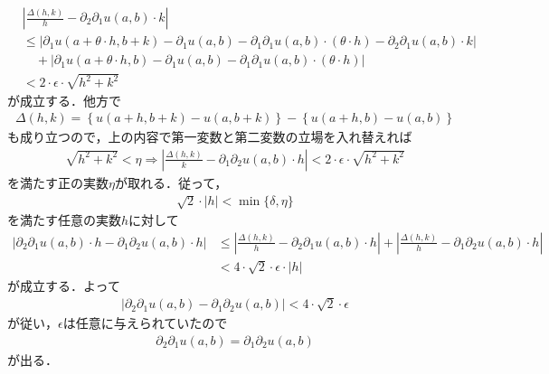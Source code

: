\begin{sketch}
		\begin{align}
			&\left|\frac{\Delta(h,k)}{h} - \partial_2 \partial_1 u(a,b) \cdot k\right| \\
			&\leq \left|\partial_1 u(a+\theta \cdot h,b+k) - \partial_1 u(a,b) 
			- \partial_1 \partial_1 u(a,b) \cdot (\theta \cdot h) - \partial_2 \partial_1 u(a,b) \cdot k\right| \\
			&\quad + \left|\partial_1 u(a+\theta \cdot h,b) - \partial_1 u(a,b) 
			- \partial_1 \partial_1 u(a,b) \cdot (\theta \cdot h)\right| \\
			&< 2 \cdot \epsilon \cdot \sqrt{h^2 + k^2}
		\end{align}
		が成立する．他方で
		\begin{align}
			\Delta(h,k) = \left\{u(a+h,b+k) - u(a,b+k)\right\} - \left\{u(a+h,b) - u(a,b)\right\}
		\end{align}
		も成り立つので，上の内容で第一変数と第二変数の立場を入れ替えれば
		\begin{align}
			\sqrt{h^2 + k^2} < \eta \Longrightarrow 
			\left|\frac{\Delta(h,k)}{k} - \partial_1 \partial_2 u(a,b) \cdot h\right| 
			< 2 \cdot \epsilon \cdot \sqrt{h^2 + k^2}
		\end{align}
		を満たす正の実数$\eta$が取れる．従って，
		\begin{align}
			\sqrt{2} \cdot |h| < \min\{\delta,\eta\}
		\end{align}
		を満たす任意の実数$h$に対して
		\begin{align}
			\left|\partial_2 \partial_1 u(a,b) \cdot h - \partial_1 \partial_2 u(a,b) \cdot h\right|
			&\leq \left|\frac{\Delta(h,k)}{h} - \partial_2 \partial_1 u(a,b) \cdot h\right| 
			+ \left|\frac{\Delta(h,k)}{h} - \partial_1 \partial_2 u(a,b) \cdot h\right| \\
			&< 4 \cdot \sqrt{2} \cdot \epsilon \cdot |h|
		\end{align}
		が成立する．よって
		\begin{align}
			\left|\partial_2 \partial_1 u(a,b) - \partial_1 \partial_2 u(a,b)\right| < 4 \cdot \sqrt{2} \cdot \epsilon
		\end{align}
		が従い，$\epsilon$は任意に与えられていたので
		\begin{align}
			\partial_2 \partial_1 u(a,b) = \partial_1 \partial_2 u(a,b)
		\end{align}
		が出る．
		\QED
	\end{sketch}